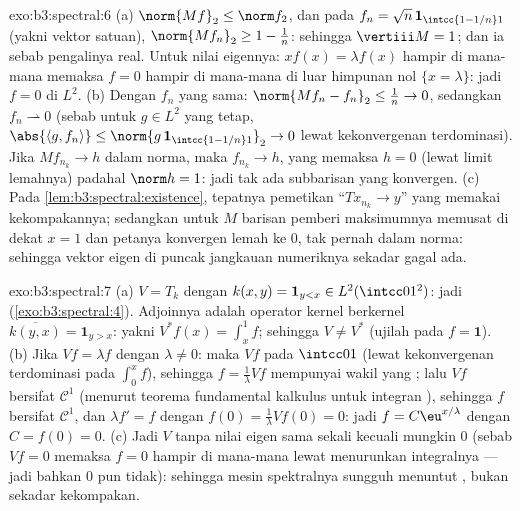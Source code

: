 \begin{solution}{exo:b3:spectral:6}
(a) $\norm{Mf}_2 \leq \norm f_2$, dan pada $f_n = \sqrt n\,
\mathbf 1_{\intcc{1 - 1/n}1}$ (yakni vektor satuan), $\norm{Mf_n}_2
\geq 1 - \frac1n$: sehingga $\vertiii M = 1$; dan ia  sebab
pengalinya real. Untuk nilai eigennya: $xf(x) = \lambda f(x)$ hampir di mana-mana
memaksa $f = 0$ hampir di mana-mana di luar himpunan nol $\{x = \lambda\}$: jadi $f =
0$ di $L^2$.
(b) Dengan $f_n$ yang sama: $\norm{Mf_n - f_n}_2 \leq \frac1n \to
0$, sedangkan $f_n \rightharpoonup 0$ (sebab untuk $g \in L^2$ yang tetap,
$\abs{\langle g, f_n\rangle} \leq \norm{g\,\mathbf
1_{\intcc{1-1/n}1}}_2 \to 0$ lewat kekonvergenan terdominasi). Jika $Mf_{n_k} \to h$ dalam
norma, maka $f_{n_k} \to h$, yang memaksa $h = 0$ (lewat limit lemahnya) padahal
$\norm h = 1$: jadi tak ada subbarisan yang konvergen.
(c) Pada \cref{lem:b3:spectral:existence}, tepatnya
pemetikan ``$Tx_{n_k} \to y$'' yang memakai kekompakannya; sedangkan untuk $M$
barisan pemberi maksimumnya memusat di dekat $x = 1$ dan
petanya konvergen lemah ke $0$, tak pernah dalam norma: sehingga vektor eigen
di puncak jangkauan numeriknya sekadar gagal ada.
\end{solution}

\begin{solution}{exo:b3:spectral:7}
(a) $V = T_k$ dengan $k(x, y) = \mathbf 1_{y < x} \in
L^2(\intcc01^2)$: jadi  (\cref{exo:b3:spectral:4}).
Adjoinnya adalah operator kernel berkernel $\overline{k(y,
x)} = \mathbf 1_{y > x}$: yakni $V^*f(x) = \int_x^1f$; sehingga $V \neq V^*$
(ujilah pada $f = \mathbf 1$).
(b) Jika $Vf = \lambda f$ dengan $\lambda \ne 0$: maka $Vf$ 
pada $\intcc01$ (lewat kekonvergenan terdominasi pada $\int_0^x f$), sehingga $f
= \frac1\lambda Vf$ mempunyai wakil yang ; lalu
$Vf$ bersifat $\mathcal C^1$ (menurut teorema fundamental kalkulus untuk
integran ), sehingga $f$ bersifat $\mathcal C^1$, dan
$\lambda f' = f$ dengan $f(0) = \frac1\lambda Vf(0) = 0$: jadi $f =
C\eu^{x/\lambda}$ dengan $C = f(0) = 0$.
(c) Jadi $V$  tanpa nilai eigen sama sekali kecuali mungkin
$0$ (sebab $Vf = 0$ memaksa $f = 0$ hampir di mana-mana lewat menurunkan
integralnya --- jadi bahkan $0$ pun tidak): sehingga mesin spektralnya
sungguh menuntut , bukan sekadar kekompakan.
\end{solution}

